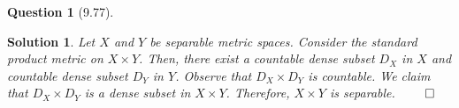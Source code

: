 \documentclass{article} %
\theoremstyle{quest}
\newtheorem*{question}{Question}
\newtheorem*{solution}{Solution}
\begin{document}
\bigskip

\begin{question}[9.77]
\end{question}
\begin{solution}
Let $X$ and $Y$ be separable metric spaces. Consider the standard
product metric on $X \times Y$. Then, there exist 
a countable dense subset $D_X$ in $X$ and countable dense 
subset $D_Y$ in $Y$. Observe that $D_X \times D_Y$ is countable. 
We claim that $D_X \times D_Y$ is a dense
subset in $X \times Y$. Therefore, $X \times Y$ is separable. $\qed$
\end{solution}
\end{document}
